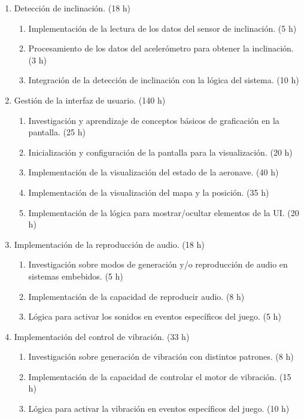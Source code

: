 \documentclass[
11pt, %
]{charter}
\begin{document}
\begin{enumerate}
\begin{enumerate}
\begin{enumerate}
	\end{enumerate}	
	\item	Detección de inclinación. (18 h)
	\begin{enumerate}	
	\item	Implementación de la lectura de los datos del sensor de inclinación. (5 h)
	\item	Procesamiento de los datos del acelerómetro para obtener la inclinación. (3 h)
	\item	Integración de la detección de inclinación con la lógica del sistema. (10 h)
	\end{enumerate}	
	\item	Gestión de la interfaz de usuario. (140 h)
	\begin{enumerate}	
	\item	Investigación y aprendizaje de conceptos básicos de graficación en la pantalla. (25 h)
	\item	Inicialización y configuración de la pantalla para la visualización. (20 h)
	\item	Implementación de la visualización del estado de la aeronave. (40 h)
	\item	Implementación de la visualización del mapa y la posición. (35 h)
	\item	Implementación de la lógica para mostrar/ocultar elementos de la UI. (20 h)
	\end{enumerate}	
	\item	Implementación de la reproducción de audio. (18 h)
	\begin{enumerate}	
	\item	Investigación sobre modos de generación y/o reproducción de audio en sistemas embebidos. (5 h)
	\item	Implementación de la capacidad de reproducir audio. (8 h)
	\item	Lógica para activar los sonidos en eventos específicos del juego. (5 h)
	\end{enumerate}	
	\item	Implementación del control de vibración. (33 h)
	\begin{enumerate}	
	\item	Investigación sobre generación de vibración con distintos patrones. (8 h)
	\item	Implementación de la capacidad de controlar el motor de vibración. (15 h)
	\item	Lógica para activar la vibración en eventos específicos del juego. (10 h)
	\end{enumerate}	

\end{enumerate}
\end{enumerate}
\end{document}

